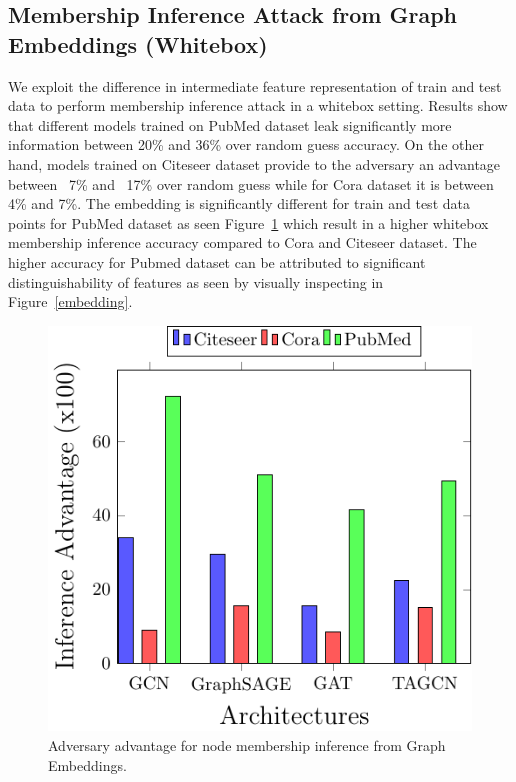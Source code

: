 \subsection{Membership Inference Attack from Graph Embeddings (Whitebox)}

We exploit the difference in intermediate feature representation of train and test data to perform membership inference attack in a whitebox setting.
Results show that different models trained on PubMed dataset leak significantly more information between 20\% and 36\% over random guess accuracy.
On the other hand, models trained on Citeseer dataset provide to the adversary an advantage between ~7\% and ~17\% over random guess while for Cora dataset it is between 4\% and 7\%.
The embedding is significantly different for train and test data points for PubMed dataset as seen Figure~\ref{fig:whitebox} which result in a higher whitebox membership inference accuracy compared to Cora and Citeseer dataset.
The higher accuracy for Pubmed dataset can be attributed to significant distinguishability of features as seen by visually inspecting in Figure~\ref{embedding}.

\begin{figure}
  \begin{center}
    \includegraphics[width=\linewidth]{figures/EmbeddingMIA/whiteboxMIA.pdf}
  \end{center}
  \caption{Adversary advantage for node membership inference from Graph Embeddings.}
  \label{fig:whitebox}
\end{figure}



